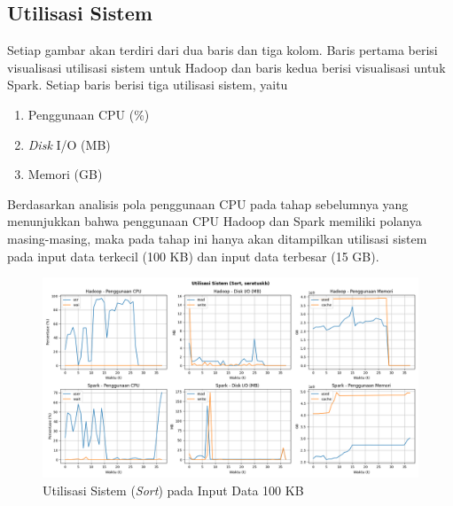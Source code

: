 %

\subsection{Utilisasi Sistem}
Setiap gambar akan terdiri dari dua baris dan tiga kolom. Baris pertama berisi visualisasi utilisasi sistem untuk Hadoop dan baris kedua berisi visualisasi untuk Spark. Setiap baris berisi tiga utilisasi sistem, yaitu
\begin{enumerate}
\item Penggunaan CPU (\%)
\item \textit{Disk} I/O (MB)
\item Memori (GB)
\end{enumerate}

Berdasarkan analisis pola penggunaan CPU pada tahap sebelumnya yang menunjukkan bahwa penggunaan CPU Hadoop dan Spark memiliki polanya masing-masing, maka pada tahap ini hanya akan ditampilkan utilisasi sistem pada input data terkecil (100 KB) dan input data terbesar (15 GB).

\begin{figure}[h]
    \centering
    \includegraphics[width=1\textwidth]{figures/ch04/5-util-sistem-sort-seratuskb}
    \caption{Utilisasi Sistem (\textit{Sort}) pada Input Data 100 KB}
    \label{fig:5-util-sistem-sort-seratuskb}
\end{figure}

